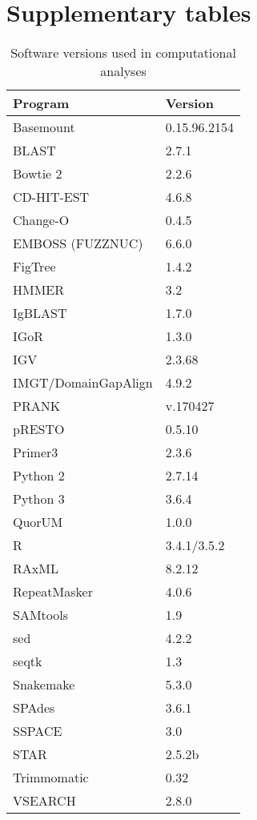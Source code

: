 \chapter{Supplementary tables}
\label{app:tables}

\begin{table}
\caption{Software versions used in computational analyses}
\begin{tabular}{ll}
  \toprule Program & Version \\ 
  \midrule Basemount & 0.15.96.2154 \\ 
  BLAST & 2.7.1 \\ 
  Bowtie 2 & 2.2.6 \\ 
  CD-HIT-EST & 4.6.8 \\ 
  Change-O & 0.4.5 \\ 
  EMBOSS (FUZZNUC) & 6.6.0 \\ 
  FigTree & 1.4.2 \\ 
  HMMER & 3.2 \\ 
  IgBLAST & 1.7.0 \\ 
  IGoR & 1.3.0 \\ 
  IGV & 2.3.68 \\ 
  IMGT/DomainGapAlign & 4.9.2 \\ 
  PRANK & v.170427 \\ 
  pRESTO & 0.5.10 \\ 
  Primer3 & 2.3.6 \\ 
  Python 2 & 2.7.14 \\ 
  Python 3 & 3.6.4 \\ 
  QuorUM & 1.0.0 \\ 
  R & 3.4.1/3.5.2 \\ 
  RAxML & 8.2.12 \\ 
  RepeatMasker & 4.0.6 \\ 
  SAMtools & 1.9 \\ 
  sed & 4.2.2 \\ 
  seqtk & 1.3 \\ 
  Snakemake & 5.3.0 \\ 
  SPAdes & 3.6.1 \\ 
  SSPACE & 3.0 \\ 
  STAR & 2.5.2b \\ 
  Trimmomatic & 0.32 \\ 
  VSEARCH & 2.8.0 \\ 
   \bottomrule \end{tabular}
\centering

\end{table}

